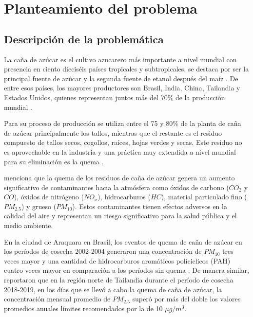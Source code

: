 \section{Planteamiento del problema}
\subsection{Descripción de la problemática}
La caña de azúcar es el cultivo azucarero más importante a nivel mundial con presencia en ciento dieciséis países tropicales y subtropicales, se destaca por ser la principal fuente de azúcar 
y la segunda fuente de etanol después del maíz \citep{oecd-fao_2023}. De entre esos países, los mayores productores son Brasil, India, China, 
Tailandia y Estados Unidos, quienes representan juntos más del 70\% de la producción mundial \citep{fao_2023}. 

Para su proceso de producción se utiliza entre el 75 y 80\% de la planta de caña de azúcar principalmente los tallos, mientras que el restante es el residuo compuesto
de tallos secos, cogollos, raíces, hojas verdes y secas. Este residuo no es aprovechable en la industria y una práctica muy extendida a nivel mundial para su eliminación es la quema \citep{singh_impact_2018}. 

\citet{franca_pre-harvest_2012} menciona que la quema de los residuos de caña de azúcar genera un aumento significativo de contaminantes hacia la atmósfera como óxidos de carbono ($CO_{2}$ y $CO$), óxidos de nitrógeno ($NO_{x}$), hidrocarburos ($HC$), 
material particulado fino ($PM_{2.5}$) y grueso ($PM_{10}$).  Estos contaminantes tienen efectos adversos en la calidad del aire y representan un riesgo significativo para la 
salud pública y el medio ambiente. 

En la ciudad de Araquara en Brasil, los eventos de quema de caña de azúcar en los períodos de cosecha 2002-2004 generaron una concentración de $PM_{10}$ 
tres veces mayor y una cantidad de hidrocarburos aromáticos políciclicos (PAH) cuatro veces mayor en comparación a los períodos sin quema \citep{de_andrade_contribution_2010}. De manera similar, \citet{junpen_estimation_2020}  
reportaron que en la región norte de Tailandia durante el período de cosecha 2018-2019, en los días que se llevó a cabo la quema de caña de azúcar, la concentración mensual promedio de $PM_{2.5}$ superó por más del doble los 
valores promedios anuales límites recomendados por la \citet{oms_2021} de 10 $\mu g/m^3$.

